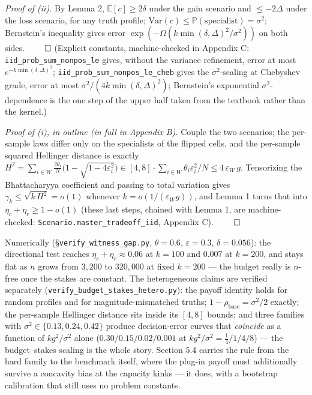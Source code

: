 \emph{Proof of (ii).} By Lemma 2, \(\mathbb E[c] \ge 2\delta\) under the
gain scenario and \(\le -2\Delta\) under the loss scenario, for any
truth profile;
\(\mathrm{Var}(c) \le \mathbb P(\text{specialist}) = \sigma^2\);
Bernstein's inequality gives error
\(\exp(-\Omega(k\min(\delta,\Delta)^2/\sigma^2))\) on both sides.
\(\qed\) (Explicit constants, machine-checked in Appendix C:
\texttt{iid\_prob\_sum\_nonpos\_le} gives, without the variance
refinement, error at most \(e^{-k\min(\delta,\Delta)^2}\);
\texttt{iid\_prob\_sum\_nonpos\_le\_cheb} gives the \(\sigma^2\)-scaling
at Chebyshev grade, error at most
\(\sigma^2/(4k\min(\delta,\Delta)^2)\); Bernstein's exponential
\(\sigma^2\)-dependence is the one step of the upper half taken from the
textbook rather than the kernel.)

\emph{Proof of (i), in outline (in full in Appendix B).} Couple the two
scenarios; the per-sample laws differ only on the specialists of the
flipped cells, and the per-sample squared Hellinger distance is exactly
\(H^2 = \sum_{i\in W}\tfrac{2\theta_i}{N}\big(1-\sqrt{1-4\varepsilon_i^2}\big)
\in [4,8]\cdot\sum_{i\in W}\theta_i\varepsilon_i^2/N \le 4\,\varepsilon_W\,g\).
Tensorizing the Bhattacharyya coefficient and passing to total variation
gives \(\gamma_k \le \sqrt{k\,H^2} = o(1)\) whenever
\(k = o(1/(\varepsilon_W g))\), and Lemma 1 turns that into
\(\eta_c+\eta_r\ge 1-o(1)\) (these last steps, chained with Lemma 1, are
machine-checked: \texttt{Scenario.master\_tradeoff\_iid}, Appendix C).
\(\qed\)

Numerically (§\texttt{verify\_witness\_gap.py}, \(\theta=0.6\),
\(\varepsilon=0.3\), \(\delta=0.056\)): the directional test reaches
\(\eta_c+\eta_r \approx 0.06\) at \(k=100\) and \(0.007\) at \(k=200\),
and stays flat as \(n\) grows from \(3{,}200\) to \(320{,}000\) at fixed
\(k=200\) --- the budget really is \(n\)-free once the stakes are
constant. The heterogeneous claims are verified separately
(\texttt{verify\_budget\_stakes\_hetero.py}): the payoff identity holds
for random profiles and for magnitude-mismatched truths;
\(1-\rho_{\mathrm{base}}=
\sigma^2/2\) exactly; the per-sample Hellinger distance sits inside its
\([4,8]\) bounds; and three families with
\(\sigma^2\in\{0.13,0.24,0.42\}\) produce decision-error curves that
\emph{coincide} as a function of \(k g^2/\sigma^2\) alone
(\(0.30/0.15/0.02/0.001\) at \(kg^2/\sigma^2=\tfrac14/1/4/8\)) --- the
budget--stakes scaling is the whole story. Section 5.4 carries the rule
from the hard family to the benchmark itself, where the plug-in payoff
must additionally survive a concavity bias at the capacity kinks --- it
does, with a bootstrap calibration that still uses no problem constants.

